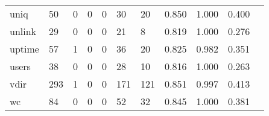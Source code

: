 \begin{longtable}{lp{1.2cm}p{1.2cm}p{1.2cm}p{1.2cm}p{1.2cm}p{1.2cm}p{1.2cm}p{1.2cm}p{1.2cm}p{1.2cm}}
uniq      &                                    50 &                                                  0 &                                                  0 &                                                  0 &                                                 30 &                                                 20 &                                         0.850 &                                              1.000 &                                              0.400 \\
unlink    &                                    29 &                                                  0 &                                                  0 &                                                  0 &                                                 21 &                                                  8 &                                         0.819 &                                              1.000 &                                              0.276 \\
uptime    &                                    57 &                                                  1 &                                                  0 &                                                  0 &                                                 36 &                                                 20 &                                         0.825 &                                              0.982 &                                              0.351 \\
users     &                                    38 &                                                  0 &                                                  0 &                                                  0 &                                                 28 &                                                 10 &                                         0.816 &                                              1.000 &                                              0.263 \\
vdir      &                                   293 &                                                  1 &                                                  0 &                                                  0 &                                                171 &                                                121 &                                         0.851 &                                              0.997 &                                              0.413 \\
wc        &                                    84 &                                                  0 &                                                  0 &                                                  0 &                                                 52 &                                                 32 &                                         0.845 &                                              1.000 &                                              0.381 \\

\end{longtable}
